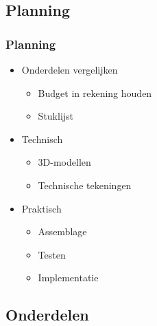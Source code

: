 \documentclass
   [kulak] %
   {kulakbeamer}
\begin{document}
\subsection{Planning}
\begin{frame}
	\frametitle{Planning}
	\begin{itemize}
		\item Onderdelen vergelijken
		\begin{itemize}
			\item Budget in rekening houden
			\item Stuklijst
		\end{itemize}
		\item Technisch
		\begin{itemize}
			\item 3D-modellen
			\item Technische tekeningen
		\end{itemize}
		\item Praktisch
		\begin{itemize}
			\item Assemblage
			\item Testen
			\item Implementatie
		\end{itemize}
	\end{itemize}
	
\end{frame}

\subsection{Onderdelen}
\end{document}
